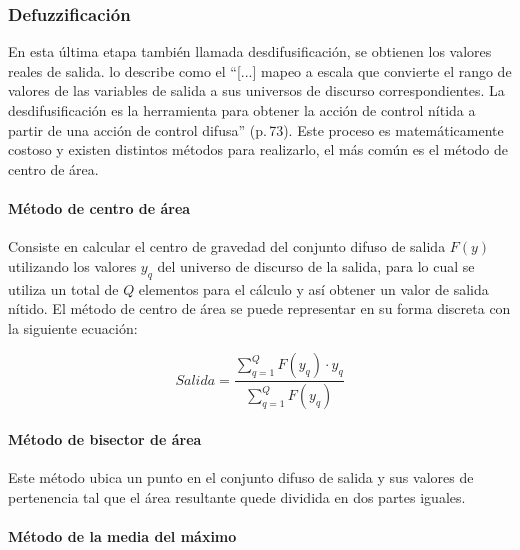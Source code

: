         \subsubsection{Defuzzificación}\label{secc:defuzzificacion}

            En esta última etapa también llamada desdifusificación, se obtienen los valores reales de salida. \textcite{cruz2010inteligencia} lo describe como el \enquote{[...] mapeo a escala que convierte el rango de valores de las variables de salida a sus universos de discurso correspondientes. La desdifusificación es la herramienta para obtener la acción de control nítida a partir de una acción de control difusa} (p.$\,$73). Este proceso es matemáticamente costoso y existen distintos métodos para realizarlo, el más común es el método de centro de área.
            
            \paragraph{Método de centro de área}

                Consiste en calcular el centro de gravedad del conjunto difuso de salida $F(y)$ utilizando los valores $y_q$ del universo de discurso de la salida, para lo cual se utiliza un total de $Q$ elementos para el cálculo y así obtener un valor de salida nítido. El método de centro de área se puede representar en su forma discreta con la siguiente ecuación:

                \pagebreak
                
                \begin{equation}\label{eq:Centroide}
                    Salida = \frac{\displaystyle\sum\limits_{q=1}^{Q}F(y_q)\cdot y_q}{\displaystyle\sum\limits_{q=1}^{Q}F(y_q)}
                \end{equation}

            \paragraph{Método de bisector de área}
                
                Este método ubica un punto en el conjunto difuso de salida y sus valores de pertenencia tal que el área resultante quede dividida en dos partes iguales.

            \paragraph{Método de la media del máximo}
                

